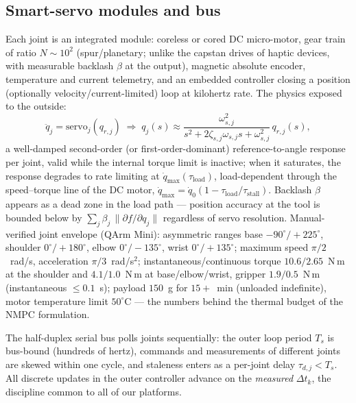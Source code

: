 \documentclass[conference]{IEEEtran}
\begin{document}
\subsection{Smart-servo modules and bus}
Each joint is an integrated module: coreless or cored DC micro-motor, gear train of ratio $N\!\sim\!10^2$ (spur/planetary; unlike the capstan drives of haptic devices, with measurable backlash $\beta$ at the output), magnetic absolute encoder, temperature and current telemetry, and an embedded controller closing a position (optionally velocity/current-limited) loop at kilohertz rate. The physics exposed to the outside:
\begin{equation}
\ddot q_j = \text{servo}_j(q_{r,j}) \;\Longrightarrow\;
q_j(s) \approx \frac{\omega_{s,j}^2}{s^2 + 2\zeta_{s,j}\omega_{s,j} s + \omega_{s,j}^2}\, q_{r,j}(s),
\label{eq:servo_tf}
\end{equation}
a well-damped second-order (or first-order-dominant) reference-to-angle response per joint, valid while the internal torque limit is inactive; when it saturates, the response degrades to rate limiting at $\dot q_{\max}(\tau_{\mathrm{load}})$, load-dependent through the speed--torque line of the DC motor, $\dot q_{\max} = \dot q_0(1 - \tau_{\mathrm{load}}/\tau_{\mathrm{stall}})$. Backlash $\beta$ appears as a dead zone in the load path --- position accuracy at the tool is bounded below by $\sum_j \beta_j\,\|\partial f/\partial q_j\|$ regardless of servo resolution. Manual-verified joint envelope (QArm Mini): asymmetric ranges base $-90^\circ/{+}225^\circ$, shoulder $0^\circ/{+}180^\circ$, elbow $0^\circ/{-}135^\circ$, wrist $0^\circ/{+}135^\circ$; maximum speed $\pi/2$~rad/s, acceleration $\pi/3$~rad/s$^2$; instantaneous/continuous torque $10.6/2.65$~N\,m at the shoulder and $4.1/1.0$~N\,m at base/elbow/wrist, gripper $1.9/0.5$~N\,m (instantaneous $\le0.1$~s); payload $150$~g for $15{+}$~min (unloaded indefinite), motor temperature limit $50^\circ$C --- the numbers behind the thermal budget of the NMPC formulation.

The half-duplex serial bus polls joints sequentially: the outer loop period $T_s$ is bus-bound (hundreds of hertz), commands and measurements of different joints are skewed within one cycle, and staleness enters as a per-joint delay $\tau_{d,j} < T_s$. All discrete updates in the outer controller advance on the \emph{measured} $\Delta t_k$, the discipline common to all of our platforms.
\end{document}
